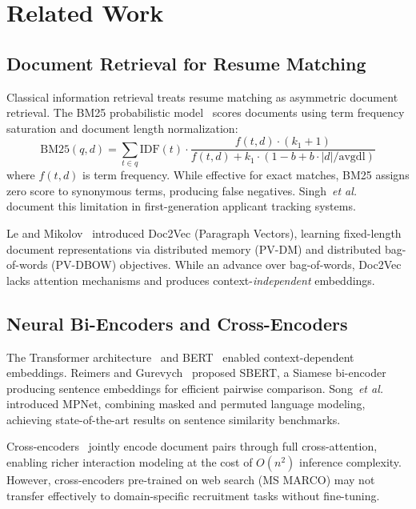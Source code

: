 \documentclass{svproc}
\begin{document}
\section{Related Work}\label{sec:related}

\subsection{Document Retrieval for Resume Matching}

Classical information retrieval treats resume matching as asymmetric document retrieval. The BM25 probabilistic model~\cite{robertson2009probabilistic} scores documents using term frequency saturation and document length normalization:
\begin{equation}
    \text{BM25}(q, d) = \sum_{t \in q} \text{IDF}(t) \cdot \frac{f(t,d) \cdot (k_1 + 1)}{f(t,d) + k_1 \cdot (1 - b + b \cdot |d|/\text{avgdl})}
\end{equation}
where $f(t,d)$ is term frequency. While effective for exact matches, BM25 assigns zero score to synonymous terms, producing false negatives. Singh~\textit{et al.}~\cite{singh2020automated} document this limitation in first-generation applicant tracking systems.

Le and Mikolov~\cite{le2014doc2vec} introduced Doc2Vec (Paragraph Vectors), learning fixed-length document representations via distributed memory (PV-DM) and distributed bag-of-words (PV-DBOW) objectives. While an advance over bag-of-words, Doc2Vec lacks attention mechanisms and produces context-\textit{independent} embeddings.

\subsection{Neural Bi-Encoders and Cross-Encoders}

The Transformer architecture~\cite{vaswani2017attention} and BERT~\cite{devlin2018bert} enabled context-dependent embeddings. Reimers and Gurevych~\cite{reimers2019sbert} proposed SBERT, a Siamese bi-encoder producing sentence embeddings for efficient pairwise comparison. Song~\textit{et al.}~\cite{song2020mpnet} introduced MPNet, combining masked and permuted language modeling, achieving state-of-the-art results on sentence similarity benchmarks.

Cross-encoders~\cite{nogueira2019crossencoder} jointly encode document pairs through full cross-attention, enabling richer interaction modeling at the cost of $O(n^2)$ inference complexity. However, cross-encoders pre-trained on web search (MS MARCO) may not transfer effectively to domain-specific recruitment tasks without fine-tuning.
\end{document}
